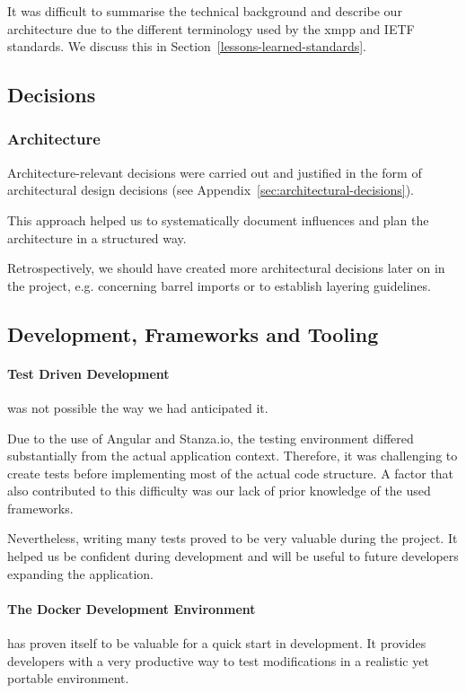It was difficult to summarise the technical background and describe our architecture due to the different terminology used by the \gls{xmpp} and IETF standards.
We discuss this in Section~\ref{lessons-learned-standards}.

\subsection{Decisions}
\subsubsection{Architecture}

Architecture-relevant decisions were carried out and justified in the form of architectural design decisions \cite{architectural-design-decisions} (see Appendix~\ref{sec:architectural-decisions}).

This approach helped us to systematically document influences and plan the architecture in a structured way.

Retrospectively, we should have created more architectural decisions later on in the project, e.g. concerning barrel imports or to establish layering guidelines.

\subsection{Development, Frameworks and Tooling}

\paragraph{Test Driven Development} was not possible the way we had anticipated it.

Due to the use of Angular and Stanza.io, the testing environment differed substantially from the actual application context.
Therefore, it was challenging to create tests before implementing most of the actual code structure.
A factor that also contributed to this difficulty was our lack of prior knowledge of the used frameworks.

Nevertheless, writing many tests proved to be very valuable during the project.
It helped us be confident during development and will be useful to future developers expanding the application.

\paragraph{The Docker Development Environment} has proven itself to be valuable for a quick start in development.
It provides developers with a very productive way to test modifications in a realistic yet portable environment.

